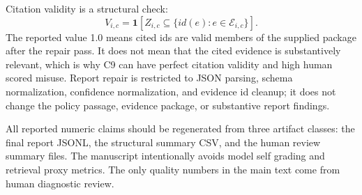 \documentclass{article}
\newcommand{\package}{\mathcal{E}}
\begin{document}
Citation validity is a structural check:
\begin{equation}
V_{i,c}=\mathbf{1}\left[ Z_{i,c}\subseteq \{id(e):e\in\package_{i,c}\}\right].
\end{equation}
The reported value 1.0 means cited ids are valid members of the supplied package after the repair pass. It does not mean that the cited evidence is substantively relevant, which is why C9 can have perfect citation validity and high human scored misuse. Report repair is restricted to JSON parsing, schema normalization, confidence normalization, and evidence id cleanup; it does not change the policy passage, evidence package, or substantive report findings.

All reported numeric claims should be regenerated from three artifact classes: the final report JSONL, the structural summary CSV, and the human review summary files. The manuscript intentionally avoids model self grading and retrieval proxy metrics. The only quality numbers in the main text come from human diagnostic review.
\end{document}
